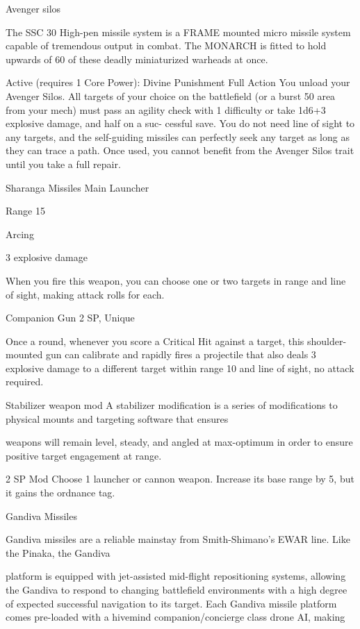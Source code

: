                                                    Avenger silos 

  The SSC 30 High-pen missile system is a FRAME mounted micro missile system capable of tremendous 
  output in combat. The MONARCH is fitted to hold upwards of 60 of these deadly miniaturized warheads 
  at once. 

  Active (requires 1 Core Power): Divine Punishment 
   Full Action 
  You unload your Avenger Silos. All targets of your choice on the battlefield (or a burst 50 area from your 
  mech) must pass an agility check with 1 difficulty or take 1d6+3 explosive damage, and half on a suc- 
  cessful save. You do not need line of sight to any targets, and the self-guiding missiles can perfectly 
  seek any target as long as they can trace a path. Once used, you cannot benefit from the Avenger Silos  
  trait until you take a full repair. 

                                                                                                                 


Sharanga Missiles  
Main Launcher
 
Range 15
 
Arcing
 
3 explosive damage
 
When you fire this weapon, you can choose one or two targets in range and line of sight, making  
attack rolls for each.
 

Companion Gun  
2 SP, Unique
 
Once a round, whenever you score a Critical Hit against a target, this shoulder-mounted gun can  
calibrate and rapidly fires a projectile that also deals 3 explosive damage to a different target  
within range 10 and line of sight, no attack required.
 

Stabilizer weapon mod  
A stabilizer modification is a series of modifications to physical mounts and targeting software that ensures  

weapons will remain level, steady, and angled at max-optimum in order to ensure positive target  
engagement at range.   

2 SP  
Mod  
Choose 1 launcher or cannon weapon. Increase its base range by 5, but it gains the ordnance  
tag.
 

Gandiva Missiles  

Gandiva missiles are a reliable mainstay from Smith-Shimano’s EWAR line. Like the Pinaka, the Gandiva  

platform is equipped with jet-assisted mid-flight repositioning systems, allowing the Gandiva to respond to  
changing battlefield environments with a high degree of expected successful navigation to its target. Each  
Gandiva missile platform comes pre-loaded with a hivemind companion/concierge class drone AI, making  


